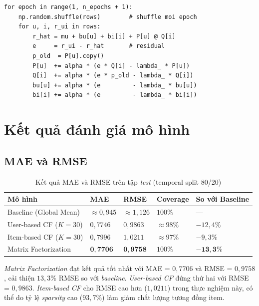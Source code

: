 \documentclass[../BTL.tex]{subfiles}
\begin{document}
\begin{lstlisting}[style=python, caption={Vòng lặp SGD cho Matrix
Factorization (Funk SVD)}]
for epoch in range(1, n_epochs + 1):
    np.random.shuffle(rows)        # shuffle moi epoch
    for u, i, r_ui in rows:
        r_hat = mu + bu[u] + bi[i] + P[u] @ Q[i]
        e     = r_ui - r_hat       # residual
        p_old  = P[u].copy()
        P[u]  += alpha * (e * Q[i] - lambda_ * P[u])
        Q[i]  += alpha * (e * p_old - lambda_ * Q[i])
        bu[u] += alpha * (e         - lambda_ * bu[u])
        bi[i] += alpha * (e         - lambda_ * bi[i])
\end{lstlisting}

\section{Kết quả đánh giá mô hình}
\label{section:3.7}

\subsection{MAE và RMSE}
\label{section:3.7.1}

\begin{table}[H]
    \centering
    \caption{Kết quả MAE và RMSE trên tập \textit{test} (temporal split 80/20)}
    \label{tab:mae_rmse}
    \begin{tabular}{lllll}
        \toprule
        \textbf{Mô hình}        & \textbf{MAE} & \textbf{RMSE}
            & \textbf{Coverage} & \textbf{So với Baseline} \\
        \midrule
        Baseline (Global Mean)  & ${\approx}0{,}945$ & ${\approx}1{,}126$
            & $100\%$ & --- \\
        User-based CF ($K=30$)  & $0{,}7746$ & $0{,}9863$
            & ${\approx}98\%$ & $-12{,}4\%$ \\
        Item-based CF ($K=30$)  & $0{,}7996$ & $1{,}0211$
            & ${\approx}97\%$ & $-9{,}3\%$ \\
        Matrix Factorization    & $\mathbf{0{,}7706}$ & $\mathbf{0{,}9758}$
            & $100\%$ & $\mathbf{-13{,}3\%}$ \\
        \bottomrule
    \end{tabular}
\end{table}

\textit{Matrix Factorization} đạt kết quả tốt nhất với MAE = $0{,}7706$ và
RMSE = $0{,}9758$, cải thiện $13{,}3\%$ RMSE so với \textit{baseline}.
\textit{User-based CF} đứng thứ hai với RMSE = $0{,}9863$.
\textit{Item-based CF} cho RMSE cao hơn ($1{,}0211$) trong thực nghiệm này,
có thể do tỷ lệ \textit{sparsity} cao ($93{,}7\%$) làm giảm chất lượng
tương đồng item.
\end{document}
